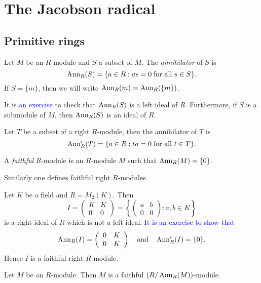 \chapter{The Jacobson radical}
\label{radical}

\section{Primitive rings}

Let $M$ be an $R$-module and $S$ a subset of $M$. The \emph{annihilator} of $S$ is
\[
\operatorname{Ann}_R(S)=\{ a\in R:as=0\;\text{for all } s\in S\} .
\]
If $S=\{m\}$, then we will write $\operatorname{Ann}_R(m)=\operatorname{Ann}_R(\{m\})$.

It is \textcolor{blue}{an exercise} to check that $\operatorname{Ann}_R(S)$ is a left ideal of $R$. Furthermore,
if $S$ is a submodule of $M$, then $\operatorname{Ann}_R(S)$ is an ideal of $R$.

Let $T$ be a subset of a right $R$-module, then the annihilator of $T$ is
\[
\operatorname{Ann}^r_R(T)=\{ a\in R: ta=0\;\text{for all }t\in T\} .
\]

\begin{definition}
    A \emph{faithful} $R$-module is an $R$-module $M$ such that $\operatorname{Ann}_R(M)=\{0\}$. 
\end{definition}

Similarly one defines faithful right $R$-modules.

\begin{example}
Let $K$ be a field and $R=M_2(K)$. Then
\[
I=\left(\begin{array}{cc} K&K\\
0&0\end{array}\right) =\left\{\left(\begin{array}{cc} a&b\\
0&0\end{array} \right): a,b\in K\right\} 
\]
is a right ideal of $R$ which is not a left ideal.
\textcolor{blue}{It is an exercise to show that} 
\[
\operatorname{Ann}_R(I)=\left(\begin{array}{cc} 0&K\\
0&K\end{array}\right)\quad\mbox{and}\quad \operatorname{Ann}^r_R(I)=\{0\}.
\]
Hence $I$ is a faithful right $R$-module.
\end{example}

\begin{lemma}\label{Lema 1.1.1}
Let $M$ be an $R$-module. Then $M$ is a faithful
$(R/\operatorname{Ann}_R(M))$-module.
\end{lemma}

